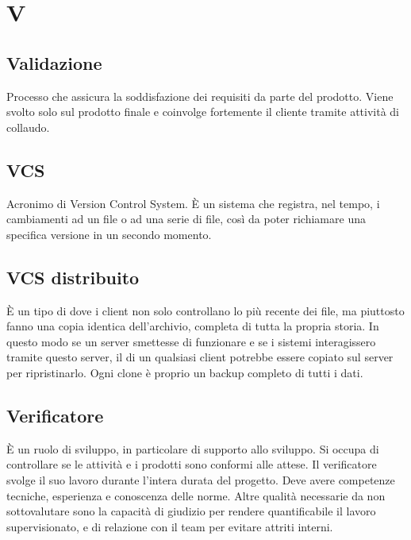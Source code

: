 \section*{V}
\markright{}

\subsection*{Validazione}
Processo che assicura la soddisfazione dei requisiti da parte del prodotto. Viene svolto solo sul prodotto finale e coinvolge fortemente il cliente tramite attività di collaudo.

\subsection*{VCS}
Acronimo di Version Control System. È un sistema che registra, nel tempo, i cambiamenti ad un file o ad una serie di file, così da poter richiamare una specifica versione in un secondo momento.

\subsection*{VCS distribuito}
È un tipo di  dove i client non solo controllano lo  più recente dei file, ma piuttosto fanno una copia identica dell'archivio, completa di tutta la propria storia. In questo modo se un server smettesse di funzionare e se i sistemi interagissero tramite questo server, il  di un qualsiasi client potrebbe essere copiato sul server per ripristinarlo. Ogni clone è proprio un backup completo di tutti i dati.

\subsection*{Verificatore}
È un ruolo di sviluppo, in particolare di supporto allo sviluppo. Si occupa di controllare se le attività e i prodotti sono conformi alle attese. Il verificatore svolge il suo lavoro durante l'intera durata del progetto. Deve avere competenze tecniche, esperienza e conoscenza delle norme. Altre qualità necessarie da non sottovalutare sono la capacità di giudizio per rendere quantificabile il lavoro supervisionato, e di relazione con il team per evitare attriti interni.


